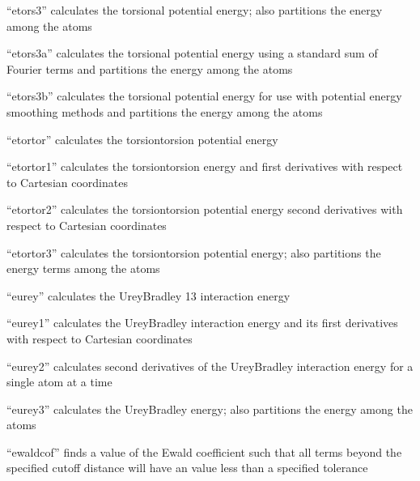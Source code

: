 \documentclass[letterpaper,11pt,english]{sphinxmanual}
\begin{document}
“etors3” calculates the torsional potential energy; also partitions the energy among the atoms


“etors3a” calculates the torsional potential energy using a standard sum of Fourier terms and partitions the energy among the atoms


“etors3b” calculates the torsional potential energy for use with potential energy smoothing methods and partitions the energy among the atoms


“etortor” calculates the torsion\sphinxhyphen{}torsion potential energy


“etortor1” calculates the torsion\sphinxhyphen{}torsion energy and first derivatives with respect to Cartesian coordinates


“etortor2” calculates the torsion\sphinxhyphen{}torsion potential energy second derivatives with respect to Cartesian coordinates


“etortor3” calculates the torsion\sphinxhyphen{}torsion potential energy; also partitions the energy terms among the atoms


“eurey” calculates the Urey\sphinxhyphen{}Bradley 1\sphinxhyphen{}3 interaction energy


“eurey1” calculates the Urey\sphinxhyphen{}Bradley interaction energy and its first derivatives with respect to Cartesian coordinates


“eurey2” calculates second derivatives of the Urey\sphinxhyphen{}Bradley interaction energy for a single atom at a time


“eurey3” calculates the Urey\sphinxhyphen{}Bradley energy; also partitions the energy among the atoms


“ewaldcof” finds a value of the Ewald coefficient such that all terms beyond the specified cutoff distance will have an value less than a specified tolerance
\end{document}
